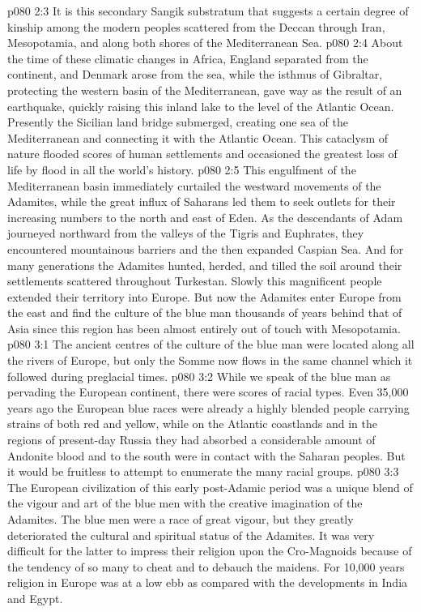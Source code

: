 \vs p080 2:3 It is this secondary Sangik substratum that suggests a certain degree of kinship among the modern peoples scattered from the Deccan through Iran, Mesopotamia, and along both shores of the Mediterranean Sea.
\vs p080 2:4 \pc About the time of these climatic changes in Africa, England separated from the continent, and Denmark arose from the sea, while the isthmus of Gibraltar, protecting the western basin of the Mediterranean, gave way as the result of an earthquake, quickly raising this inland lake to the level of the Atlantic Ocean. Presently the Sicilian land bridge submerged, creating one sea of the Mediterranean and connecting it with the Atlantic Ocean. This cataclysm of nature flooded scores of human settlements and occasioned the greatest loss of life by flood in all the world’s history.
\vs p080 2:5 This engulfment of the Mediterranean basin immediately curtailed the westward movements of the Adamites, while the great influx of Saharans led them to seek outlets for their increasing numbers to the north and east of Eden. As the descendants of Adam journeyed northward from the valleys of the Tigris and Euphrates, they encountered mountainous barriers and the then expanded Caspian Sea. And for many generations the Adamites hunted, herded, and tilled the soil around their settlements scattered throughout Turkestan. Slowly this magnificent people extended their territory into Europe. But now the Adamites enter Europe from the east and find the culture of the blue man thousands of years behind that of Asia since this region has been almost entirely out of touch with Mesopotamia.
\vs p080 3:1 The ancient centres of the culture of the blue man were located along all the rivers of Europe, but only the Somme now flows in the same channel which it followed during preglacial times.
\vs p080 3:2 While we speak of the blue man as pervading the European continent, there were scores of racial types. Even 35,000 years ago the European blue races were already a highly blended people carrying strains of both red and yellow, while on the Atlantic coastlands and in the regions of present\hyp{}day Russia they had absorbed a considerable amount of Andonite blood and to the south were in contact with the Saharan peoples. But it would be fruitless to attempt to enumerate the many racial groups.
\vs p080 3:3 The European civilization of this early post\hyp{}Adamic period was a unique blend of the vigour and art of the blue men with the creative imagination of the Adamites. The blue men were a race of great vigour, but they greatly deteriorated the cultural and spiritual status of the Adamites. It was very difficult for the latter to impress their religion upon the Cro\hyp{}Magnoids because of the tendency of so many to cheat and to debauch the maidens. For 10,000 years religion in Europe was at a low ebb as compared with the developments in India and Egypt.

